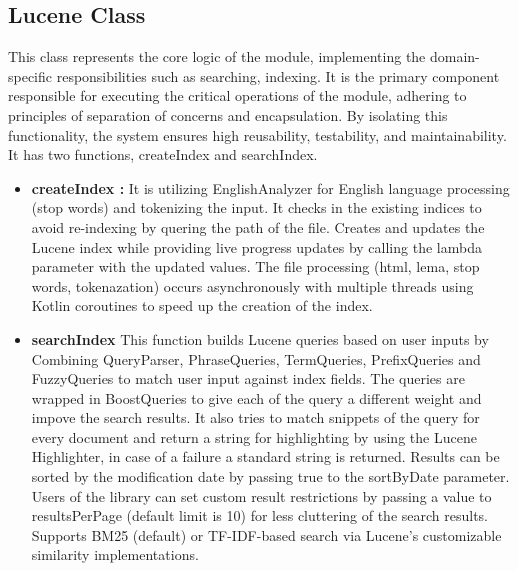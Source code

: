 \documentclass[conference]{IEEEtran}
\begin{document}
{        \subsection{\textbf{Lucene Class}}{This class represents the core logic of the module, implementing the domain-specific responsibilities such as searching, indexing.
        It is the primary component responsible for executing the critical operations of the module, adhering to principles of separation of concerns and encapsulation.
        By isolating this functionality, the system ensures high reusability, testability, and maintainability.
        It has two functions, createIndex and searchIndex.
            \begin{itemize}
                \item \textbf{createIndex :}{
                    It is utilizing EnglishAnalyzer for English language processing (stop words) and tokenizing the input.
                    It checks in the existing indices to avoid re-indexing by quering the path of the file.
                    Creates and updates the Lucene index while providing live progress updates by calling the lambda parameter with the updated values.
                    The file processing (html, lema, stop words, tokenazation) occurs asynchronously with multiple threads using Kotlin coroutines to speed up the creation of the index.
                }

                \item \textbf{searchIndex}{
                    This function builds Lucene queries based on user inputs by Combining QueryParser, PhraseQueries, TermQueries, PrefixQueries and FuzzyQueries to match user input against index fields.
                    The queries are wrapped in BoostQueries to give each of the query a different weight and impove the search results.
                    It also tries to match snippets of the query for every document and return a string for highlighting by using the Lucene Highlighter, in case of a failure a standard string is returned.
                    Results can be sorted by the modification date by passing true to the sortByDate parameter.
                    Users of the library can set custom result restrictions by passing a value to resultsPerPage (default limit is 10) for less cluttering of the search results.
                    Supports BM25 (default) or TF-IDF-based search via Lucene's customizable similarity implementations.
                }

            \end{itemize}}\label{lucene-class}
}
\end{document}
